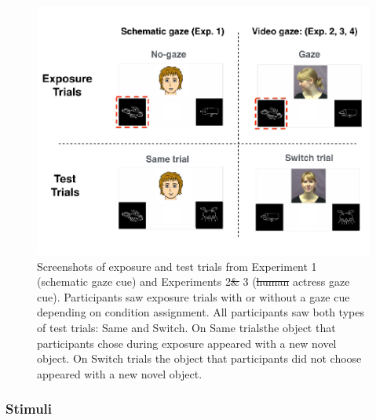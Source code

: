 \documentclass[authoryear, review]{elsarticle}
\newenvironment{CodeChunk}{}{}
\providecommand{\DIFaddtex}[1]{{\protect\color{blue}\uwave{#1}}} %
\providecommand{\DIFdeltex}[1]{{\protect\color{red}\sout{#1}}}                      %
\providecommand{\DIFaddFL}[1]{\DIFadd{#1}} %
\providecommand{\DIFdelFL}[1]{\DIFdel{#1}} %
\providecommand{\DIFaddbeginFL}{} %
\providecommand{\DIFaddendFL}{} %
\providecommand{\DIFdelbeginFL}{} %
\providecommand{\DIFdelendFL}{} %
\providecommand{\DIFadd}[1]{\texorpdfstring{\DIFaddtex{#1}}{#1}} %
\providecommand{\DIFdel}[1]{\texorpdfstring{\DIFdeltex{#1}}{}} %
\begin{document}
\begin{CodeChunk}
\begin{figure}[tb]
\DIFdelbeginFL %
\DIFdelendFL \DIFaddbeginFL 

{\centering \includegraphics[width=1\linewidth]{figs/stimuli-1} 

}

\caption[Screenshots of exposure and test trials from Experiment 1 (schematic gaze cue) and Experiments 2, 3 \& 4 (live actress gaze cue)]{\DIFaddendFL Screenshots of exposure and test trials from Experiment 1 (schematic gaze cue) and Experiments 2\DIFdelbeginFL \DIFdelFL{\& }\DIFdelendFL \DIFaddbeginFL \DIFaddFL{, }\DIFaddendFL 3 \DIFaddbeginFL \DIFaddFL{\& 4 }\DIFaddendFL (\DIFdelbeginFL \DIFdelFL{human }\DIFdelendFL \DIFaddbeginFL \DIFaddFL{live }\DIFaddendFL actress gaze cue). Participants saw exposure trials with or without a gaze cue depending on condition assignment. All participants saw both types of test trials: Same and Switch. On Same trials\DIFaddbeginFL \DIFaddFL{, }\DIFaddendFL the object that participants chose during exposure appeared with a new novel object. On Switch trials the object that participants did not choose appeared with a new novel object.}\label{fig:stimuli}
\end{figure}
\end{CodeChunk}

\subsubsection{Stimuli}\label{stimuli}
\end{document}
